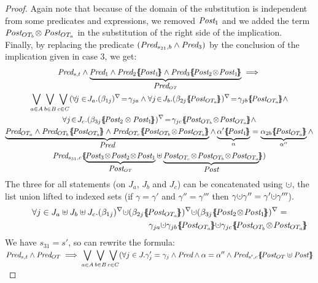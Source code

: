 \documentclass{lmcs}
\newcommand{\shortotimes}{\!\otimes\!}
\begin{document}
\begin{proof}
Again note that because of the domain  of the substitution is independent from some predicates and expressions, we removed $\Post_1$ and  we  added the term $\Post_{OT_{b}}\shortotimes\,\Post_{OT_a}$ in the substitution of the right side of the implication.\\
Finally, by replacing the predicate $(\Pred_{s_{21},b} \land  \Pred_3)$
by the conclusion of the  implication given in case 3, we get:
\begin{multline*}\Pred_{s,t} \land \underbrace{\Pred_1\land \Pred_2\subst{\Post_1} \land \Pred_3\subst{\Post_2\shortotimes\Post_1}}_{\Pred_{OT}}\implies\\
 {\bigvee_{a\in A}}\, {\bigvee_{b\in B}}\, {\bigvee_{c\in C}} 
(\forall\! j\in\! J_a.\vis{\beta_{1j}}\!=\!\gamma_{ja} \land  \forall j \!\in\! J_{b}.\vis{\beta_{2j}\subst{\Post_{OT_a}}}\!=\!\gamma_{jb} \subst{\Post_{OT_a}}  \land \\
 \forall j\!\in\! J_{c}. \vis{\beta_{3j} \subst{\Post_2\,\shortotimes\,\Post_1}} \!=\!\gamma_{jc} \subst{\Post_{OT_{b}}\shortotimes\Post_{OT_a}}  \land\\
   \underbrace{\Pred_{OT_a}\land\Pred_{OT_{b}} \subst{\Post_{OT_a}} \land 
  \Pred_{OT_{c}}\subst{\Post_{OT_{b}}\shortotimes\Post_{OT_a}}}_{\Pred} \land  \underbrace{\alpha'\subst{\Post_1}}_{\alpha}=\underbrace{\alpha_{2 b} \subst{\Post_{OT_a}}}_{\alpha''} \land\\ \Pred_{s_{31},c}  \subst{\underbrace{\Post_3\shortotimes\Post_2\shortotimes\Post_1}_{\Post_{OT}}\uplus \underbrace{\Post_{OT_{c}}\shortotimes \Post_{OT_{b}}\shortotimes\Post_{OT_a}}_{\Post}})
\end{multline*}
The three for all statements (on $J_a$, $J_b$ and $J_c$) can be concatenated using $\dotcup$, the list union lifted to indexed sets (if $\gamma=\gamma'$ and $\gamma''=\gamma'''$ then $\gamma\dotcup\gamma''=\gamma'\dotcup\gamma'''$).
\begin{multline*}\forall j\in J_a\uplus J_b\uplus J_c.  \vis{\beta_{1j}}\dotcup \vis{\beta_{2j}\subst{\Post_{OT_a}}}\dotcup \vis{\beta_{3j} \subst{\Post_2\shortotimes\Post_1}}=\\ ~\hspace{5.5cm} \gamma_{j a} \dotcup \gamma_{jb} \subst{\Post_{OT_a}}  \dotcup \gamma_{jc} \subst{\Post_{OT_{b}}\shortotimes\Post_{OT_a}}
\end{multline*}
We have  $s_{31}=s'$, so can rewrite the formula:\\
$\Pred_{s,t} \land \Pred_{OT}\implies
\displaystyle{\bigvee_{a\in A}}\, \displaystyle{\bigvee_{b\in B}}\, \displaystyle{\bigvee_{c\in C}} 
(\forall j\in J.\gamma_j'=\gamma_j \land  \Pred \land \alpha=\alpha''  \land \Pred_{s',c}\subst{\Post_{OT}\uplus\Post\,}$\\


\end{proof}
\end{document}
